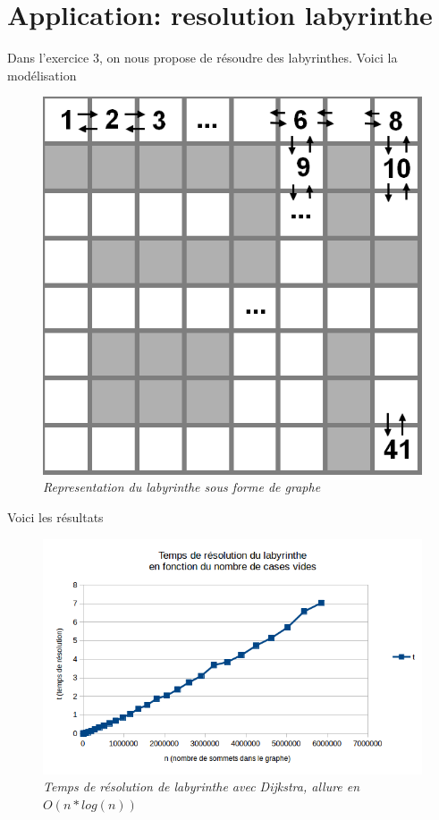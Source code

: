 \documentclass[10pt]{article}
\begin{document}
	\newpage
	\section{Application: resolution labyrinthe}
		Dans l'exercice 3, on nous propose de résoudre des labyrinthes.
		Voici la modélisation
		\begin{figure}[H]
			\begin{center}
				\includegraphics[width=12cm,height=\textheight,keepaspectratio]{./images/lab.png}
			\end{center}
			\caption{\textit{Representation du labyrinthe sous forme de graphe}}
		\end{figure}
		Voici les résultats 
		\begin{figure}[H]
			\begin{center}
				\includegraphics[width=12cm,height=\textheight,keepaspectratio]{./images/courbe_temps.png}
			\end{center}
			\caption{\textit{Temps de résolution de labyrinthe avec Dijkstra, allure en \(O(n * log(n))\)}}
		\end{figure}
\end{document}
